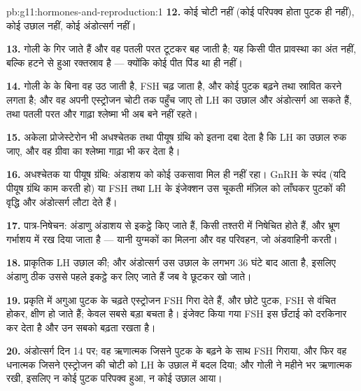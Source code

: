 \begin{solution}{pb:g11:hormones-and-reproduction:1}
\textbf{12.} कोई चोटी नहीं (कोई परिपक्व होता पुटक ही नहीं), कोई उछाल नहीं,
कोई अंडोत्सर्ग नहीं।

\textbf{13.} गोली के  गिर जाते हैं और वह पतली परत टूटकर बह जाती
है; यह किसी पीत प्रावस्था का अंत नहीं, बल्कि  हटने से हुआ रक्तस्राव
है --- क्योंकि कोई पीत पिंड था ही नहीं।

\textbf{14.} गोली के  के बिना वह  उठ जाती है, FSH चढ़
जाता है, और कोई पुटक बढ़ने तथा स्रावित करने लगता है; और वह अपनी एस्ट्रोजन
चोटी तक पहुँच जाए तो LH का उछाल और अंडोत्सर्ग आ सकते हैं, तथा पतली परत और
गाढ़ा श्लेष्मा भी अब बने नहीं रहते।

\textbf{15.} अकेला प्रोजेस्टेरोन भी अधश्चेतक तथा पीयूष ग्रंथि को इतना दबा
देता है कि LH का उछाल रुक जाए, और वह ग्रीवा का श्लेष्मा गाढ़ा भी कर देता
है।

\textbf{16.} अधश्चेतक या पीयूष ग्रंथि: अंडाशय को कोई उकसावा मिल ही नहीं
रहा। GnRH के स्पंद (यदि पीयूष ग्रंथि काम करती हो) या FSH तथा LH के
इंजेक्शन उस चूकती मंज़िल को लाँघकर पुटकों की वृद्धि और अंडोत्सर्ग लौटा देते
हैं।

\textbf{17.} पात्र-निषेचन: अंडाणु अंडाशय से इकट्ठे किए जाते हैं, किसी
तश्तरी में निषेचित होते हैं, और भ्रूण गर्भाशय में रख दिया जाता है ---
यानी युग्मकों का मिलना और वह परिवहन, जो अंडवाहिनी करती।

\textbf{18.} प्राकृतिक LH उछाल की; और अंडोत्सर्ग उस उछाल के लगभग 36 घंटे
बाद आता है, इसलिए अंडाणु ठीक उससे पहले इकट्ठे कर लिए जाते हैं जब वे छूटकर
खो जाते।

\textbf{19.} प्रकृति में अगुआ पुटक के चढ़ते एस्ट्रोजन FSH गिरा देते हैं,
और छोटे पुटक, FSH से वंचित होकर, क्षीण हो जाते हैं; केवल सबसे बड़ा बचता
है। इंजेक्ट किया गया FSH इस छँटाई को दरकिनार कर देता है और उन सबको बढ़ता
रखता है।

\textbf{20.} अंडोत्सर्ग दिन 14 पर; वह ऋणात्मक  जिसने पुटक के
बढ़ने के साथ FSH गिराया, और फिर वह धनात्मक  जिसने एस्ट्रोजन की
चोटी को LH के उछाल में बदल दिया; और गोली ने महीने भर  ऋणात्मक
रखी, इसलिए न कोई पुटक परिपक्व हुआ, न कोई उछाल आया।
\end{solution}
